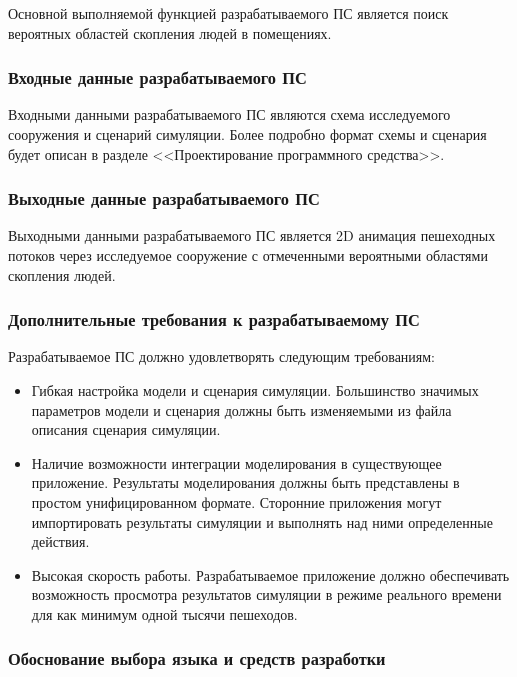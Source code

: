 Основной выполняемой функцией разрабатываемого ПС является поиск вероятных областей скопления людей в помещениях.

\subsubsection{Входные данные разрабатываемого ПС}
\label{sub:domain:requirements:input}

Входными данными разрабатываемого ПС являются схема исследуемого сооружения и сценарий симуляции.
Более подробно формат схемы и сценария будет описан в разделе <<Проектирование программного средства>>.

\subsubsection{Выходные данные разрабатываемого ПС}
\label{sub:domain:requirements:output}

Выходными данными разрабатываемого ПС является 2D анимация пешеходных потоков через исследуемое сооружение с отмеченными вероятными областями скопления людей.

\subsubsection{Дополнительные требования к разрабатываемому ПС}
\label{sub:domain:requirements:additional}

Разрабатываемое ПС должно удовлетворять следующим требованиям:
\begin{itemize}
  \item Гибкая настройка модели и сценария симуляции.
        Большинство значимых параметров модели и сценария должны быть изменяемыми из файла описания сценария симуляции.
  \item Наличие возможности интеграции моделирования в существующее приложение.
        Результаты моделирования должны быть представлены в простом унифицированном формате.
        Сторонние приложения могут импортировать результаты симуляции и выполнять над ними определенные действия.
  \item Высокая скорость работы.
        Разрабатываемое приложение должно обеспечивать возможность просмотра результатов симуляции в режиме реального времени для как минимум одной тысячи пешеходов.
\end{itemize}

\subsubsection{Обоснование выбора языка и средств разработки}
\label{sub:domain:requirements:langs}

